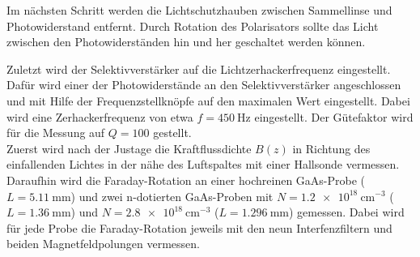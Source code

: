 Im nächsten Schritt werden die Lichtschutzhauben zwischen Sammellinse und Photowiderstand entfernt. 
Durch Rotation des Polarisators sollte das Licht zwischen den Photowiderständen hin und her geschaltet werden können.

Zuletzt wird der Selektivverstärker auf die Lichtzerhackerfrequenz eingestellt. Dafür wird einer der Photowiderstände an den Selektivverstärker angeschlossen und mit Hilfe der
Frequenzstellknöpfe auf den maximalen Wert eingestellt. Dabei wird eine Zerhackerfrequenz von etwa $f = \SI{450}{\Hz}$ eingestellt.
Der Gütefaktor wird für die Messung auf $Q = 100$ gestellt.
\\
Zuerst wird nach der Justage die Kraftflussdichte $B(z)$ in Richtung des einfallenden Lichtes in der nähe des Luftspaltes mit einer Hallsonde vermessen.
Daraufhin wird die Faraday-Rotation an einer hochreinen GaAs-Probe ($L = \SI{5.11}{\milli\meter}$)
und zwei n-dotierten GaAs-Proben mit $N = \SI{1.2e18}{\cm^{-3}}$ ($L = \SI{1.36}{\milli\meter}$) und $N = \SI{2.8e18}{\cm^{-3}}$ ($L = \SI{1.296}{\milli\meter}$) gemessen.
Dabei wird für jede Probe die Faraday-Rotation jeweils mit den neun Interfenzfiltern und beiden Magnetfeldpolungen vermessen.